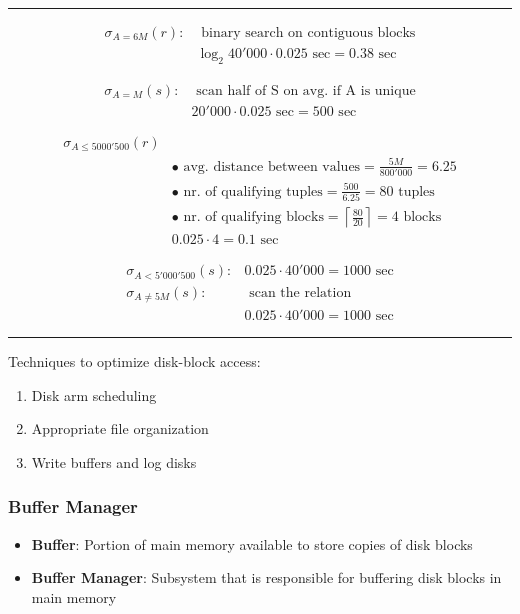 \rule{250pt}{0.4pt}
\begin{align*}
    \sigma_{A = 6M}(r) : &\text{ binary search on contiguous blocks} \\
    &\log_2 40'000 \cdot 0.025 \text{ sec} = 0.38 \text{ sec}
\end{align*}

\begin{align*}
    \sigma_{A = M}(s) : &\text{ scan half of S on avg. if A is unique} \\
    &20'000 \cdot 0.025 \text{ sec} = 500 \text{ sec}
\end{align*}

\begin{align*}
    \sigma_{A \leq 5000'500}(r) \\
    &\bullet \text{ avg. distance between values} = \frac{5M}{800'000} = 6.25 \\
    &\bullet \text{ nr. of qualifying tuples} = \frac{500}{6.25} = 80 \text{ tuples} \\
    &\bullet \text{ nr. of qualifying blocks} = \left\lceil \frac{80}{20} \right\rceil = 4 \text{ blocks} \\
    &0.025 \cdot 4 = 0.1 \text{ sec}
\end{align*}

\begin{align*}
    \sigma_{A<5'000'500}(s): &0.025\cdot 40'000= 1000 \text{ sec}\\
    \sigma_{A\neq 5M}(s): &\text{ scan the relation} \\
    &0.025 \cdot 40'000 = 1000 \text{ sec}
\end{align*}
\rule{\linewidth}{0.4pt}

Techniques to optimize disk-block access:
\begin{enumerate}
    \item Disk arm scheduling
    \item Appropriate file organization
    \item Write buffers and log disks
\end{enumerate}

\subsubsection{Buffer Manager}
\begin{itemize}[label=\(\rhd\)]
    \item \textbf{Buffer}: Portion of main memory available to store copies of disk blocks
    \item \textbf{Buffer Manager}: Subsystem that is responsible for buffering disk blocks in main memory
\end{itemize}

